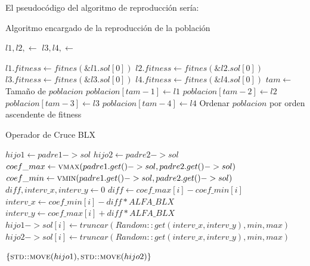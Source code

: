 \documentclass[a4paper]{report}
\begin{document}
El pseudocódigo del algoritmo de reproducción sería:
\begin{algorithm}[H]
    \caption{Algoritmo encargado de la reproducción de la población}
    \begin{algorithmic}[1]
        \State $l1, l2, \gets$ 
        \State $l3, l4, \gets$ 

        \State $l1.fitness \gets fitnes(\&l1.sol[0])$
        \State $l2.fitness \gets fitnes(\&l2.sol[0])$
        \State $l3.fitness \gets fitnes(\&l3.sol[0])$
        \State $l4.fitness \gets fitnes(\&l4.sol[0])$
        \State $tam \gets$ Tamaño de $poblacion$
        \State $poblacion[tam - 1] \gets l1$
        \State $poblacion[tam - 2] \gets l2$
        \State $poblacion[tam - 3] \gets l3$
        \State $poblacion[tam - 4] \gets l4$
        \State Ordenar $poblacion$ por orden ascendente de fitness
        \EndFunction
    \end{algorithmic}


\end{algorithm}

\begin{algorithm}[H]
    \caption{Operador de Cruce BLX}
    \begin{algorithmic}[1]
        \State $hijo1 \gets padre1->sol$
        \State $hijo2 \gets padre2->sol$
        \State $coef\_max \gets \Call{vmax}{padre1.get()->sol, padre2.get()->sol}$ 
        \State $coef\_min \gets \Call{vmin}{padre1.get()->sol, padre2.get()->sol}$
        \State $diff, interv\_x, interv\_y \gets 0$
        \State $diff \gets coef\_max[i] - coef\_min[i]$
        \State $interv\_x \gets coef\_min[i] - diff * ALFA\_BLX$
        \State $interv\_y \gets coef\_max[i] + diff * ALFA\_BLX$
        \State $hijo1->sol[i] \gets truncar(Random::get(interv\_x, interv\_y), min, max)$
        \State $hijo2->sol[i] \gets truncar(Random::get(interv\_x, interv\_y), min, max)$

        \EndFor
        \State \Return $\{\Call{std::move}{hijo1}, \Call{std::move}{hijo2}\}$
        \EndFunction
    \end{algorithmic}


\end{algorithm}
\end{document}
